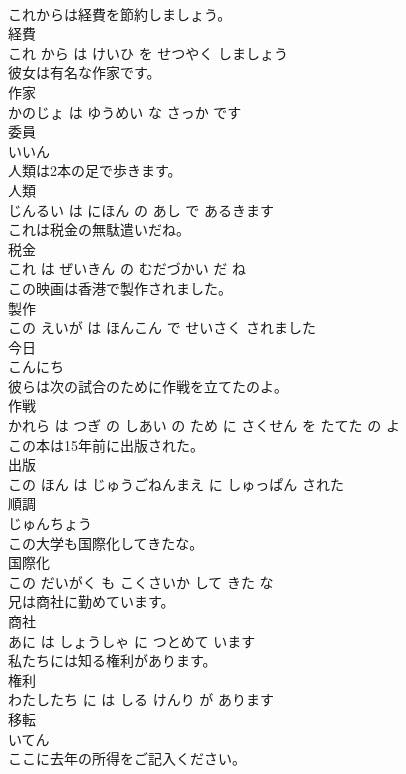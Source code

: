 \documentclass[8pt]{extreport}
\begin{document}
\begin{CJK}{UTF8}{min}
\\	これからは経費を節約しましょう。	
\\	経費 
\\	これ から は けいひ を せつやく しましょう		
\\	彼女は有名な作家です。	
\\	作家 
\\	かのじょ は ゆうめい な さっか です		
\\	委員	
\\	いいん		
\\	人類は2本の足で歩きます。	
\\	人類 
\\	じんるい は にほん の あし で あるきます		
\\	これは税金の無駄遣いだね。	
\\	税金 
\\	これ は ぜいきん の むだづかい だ ね		
\\	この映画は香港で製作されました。	
\\	製作 
\\	この えいが は ほんこん で せいさく されました		
\\	今日	
\\	こんにち		
\\	彼らは次の試合のために作戦を立てたのよ。	
\\	作戦 
\\	かれら は つぎ の しあい の ため に さくせん を たてた の よ		
\\	この本は15年前に出版された。	
\\	出版 
\\	この ほん は じゅうごねんまえ に しゅっぱん された		
\\	順調	
\\	じゅんちょう		
\\	この大学も国際化してきたな。	
\\	国際化 
\\	この だいがく も こくさいか して きた な		
\\	兄は商社に勤めています。	
\\	商社 
\\	あに は しょうしゃ に つとめて います		
\\	私たちには知る権利があります。	
\\	権利 
\\	わたしたち に は しる けんり が あります		
\\	移転	
\\	いてん		
\\	ここに去年の所得をご記入ください。	

\end{CJK}
\end{document}
